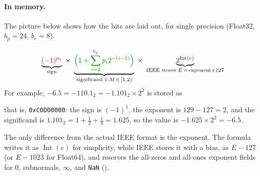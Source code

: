 \paragraph{In memory.} The picture below shows how the bits are laid out, for single precision (Float32, $b_p = 24$, $b_e = 8$).
\begin{center}
\end{center}
\begin{equation*}
  \underbrace{\color{red!70!black}(-1)^{p_1}}_{\text{sign}}
  \;\times\;
  \underbrace{\color{green!45!black}\Bigl(1 + \sum_{i=2}^{b_p} p_i 2^{-(i-1)}\Bigr)}_{\text{significand } 1.M \,\in\, [1, 2)}
  \;\times\;
  \underbrace{\color{blue!70!black}2^{\operatorname{Int}(e)}}_{\text{IEEE stores } E \,=\, \text{exponent} + 127}
\end{equation*}
For example, $-6.5 = -110.1_2 = -1.101_2 \times 2^2$ is stored as
\begin{center}
\end{center}
that is, \texttt{0xC0D00000}: the sign is $(-1)^1$, the exponent is $129 - 127 = 2$, and the significand is $1.101_2 = 1 + \frac12 + \frac18 = 1.625$, so the value is $-1.625 \times 2^2 = -6.5$.

The only difference from the actual IEEE format is the exponent. The formula writes it as $\operatorname{Int}(e)$ for simplicity, while IEEE stores it with a bias, as $E - 127$ (or $E - 1023$ for Float64), and reserves the all-zeros and all-ones exponent fields for $0$, subnormals, $\infty$, and \texttt{NaN} ().

